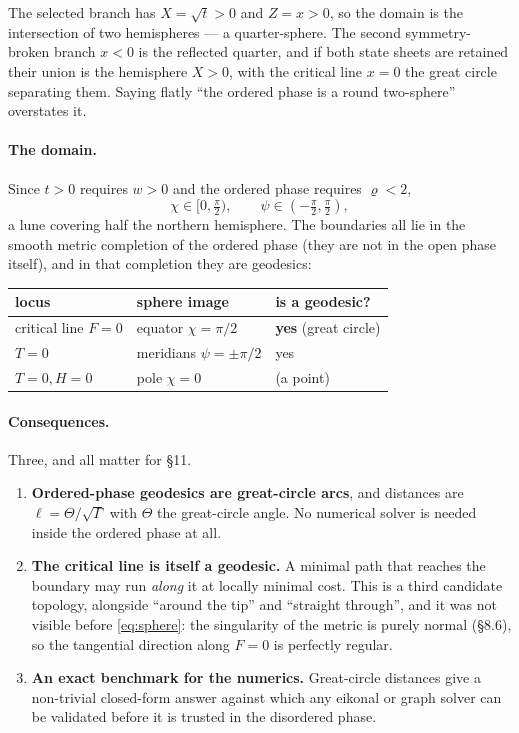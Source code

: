  The selected branch has $X=\sqrt t>0$ and $Z=x>0$, so
the domain is the intersection of two hemispheres --- a quarter-sphere. The second
symmetry-broken branch $x<0$ is the reflected quarter, and if both state sheets are retained
their union is the hemisphere $X>0$, with the critical line $x=0$ the great circle separating
them. Saying flatly ``the ordered phase is a round two-sphere'' overstates it.

\paragraph{The domain.} Since $t>0$ requires $w>0$ and the ordered phase requires
$\varrho<2$,
\begin{equation}
  \chi\in[0,\tfrac\pi2),\qquad \psi\in(-\tfrac\pi2,\tfrac\pi2),
\end{equation}
a lune covering half the northern hemisphere. The boundaries all lie in the smooth metric
completion of the ordered phase (they are not in the open phase itself), and in that
completion they are geodesics:
\begin{center}
\begin{tabular}{lll}
\hline
locus & sphere image & is a geodesic?\\
\hline
critical line $F=0$ & equator $\chi=\pi/2$ & \textbf{yes} (great circle)\\
$T=0$ & meridians $\psi=\pm\pi/2$ & yes\\
$T=0,H=0$ & pole $\chi=0$ & (a point)\\
\hline
\end{tabular}
\end{center}

\paragraph{Consequences.} Three, and all matter for \S11.
\begin{enumerate}
  \item \textbf{Ordered-phase geodesics are great-circle arcs}, and distances are
        $\ell=\Theta/\sqrt\Gamma$ with $\Theta$ the great-circle angle. No numerical solver
        is needed inside the ordered phase at all.
  \item \textbf{The critical line is itself a geodesic.} A minimal path that reaches the
        boundary may run \emph{along} it at locally minimal cost. This is a third candidate
        topology, alongside ``around the tip'' and ``straight through'', and it was not
        visible before \eqref{eq:sphere}: the singularity of the metric is purely normal
        (\S8.6), so the tangential direction along $F=0$ is perfectly regular.
  \item \textbf{An exact benchmark for the numerics.} Great-circle distances give a
        non-trivial closed-form answer against which any eikonal or graph solver can be
        validated before it is trusted in the disordered phase.
\end{enumerate}

